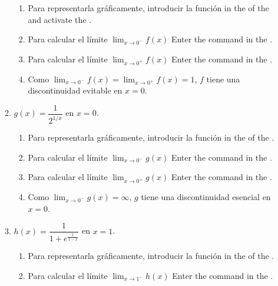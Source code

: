 \begin{enumerate}[leftmargin=*]
\begin{enumerate}
            \begin{indication}
            \begin{enumerate}
            \item Para representarla gráficamente, introducir la función  in the  of the   and activate the .
            \item Para calcular el límite $\lim_{x\rightarrow 0^-}f(x)$ Enter the command  in the .
            \item Para calcular el límite $\lim_{x\rightarrow 0^+}f(x)$ Enter the command  in the .
            \item Como $\lim_{x\rightarrow 0^-}f(x)=\lim_{x\rightarrow 0^+}f(x)=1$, $f$ tiene una discontinuidad evitable en $x=0$.
            \end{enumerate}
            \end{indication}
      \item $g(x)=\dfrac{1}{2^{1/x}}$ en $x=0$.
            \begin{indication}
            \begin{enumerate}
            \item Para representarla gráficamente, introducir la función  in the  of the  .
            \item Para calcular el límite $\lim_{x\rightarrow 0^-}g(x)$ Enter the command  in the .
            \item Para calcular el límite $\lim_{x\rightarrow 0^+}g(x)$ Enter the command  in the .
            \item Como $\lim_{x\rightarrow 0^-}g(x)=\infty$, $g$ tiene una discontinuidad esencial en $x=0$.
            \end{enumerate}
            \end{indication}
      \item $h(x)=\dfrac{1}{1+e^{\frac{1}{1-x}}}$ en $x=1$.
            \begin{indication}
            \begin{enumerate}
            \item Para representarla gráficamente, introducir la función  in the  of the  .
            \item Para calcular el límite $\lim_{x\rightarrow 1^-}h(x)$ Enter the command  in the .

\end{enumerate}
\end{indication}
\end{enumerate}
\end{enumerate}
